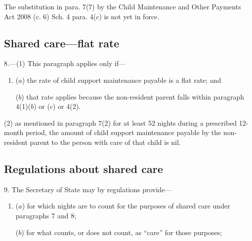 \documentclass[12pt,a4paper]{article}
\begin{document}
{{The substitution in para. 7(7) by the Child Maintenance and Other Payments Act 2008 (c. 6) Sch. 4 para. 4($c$) is not yet in force.
}

\subsection*{Shared care---flat rate}

8.—(1) This paragraph applies only if---
\begin{enumerate}\item[]
($a$) the rate of child support maintenance payable is a flat rate; and

($b$) that rate applies because the non-resident parent falls within paragraph
4(1)($b$) or ($c$) or 4(2).
\end{enumerate}

(2) 
 as mentioned in paragraph 7(2) for at least 52 nights during a prescribed 12-month period, the amount of child support maintenance payable by the non-resident parent to the person with care of that child is nil.


\subsection*{Regulations about shared care}

9. The Secretary of State may by regulations provide---
\begin{enumerate}\item[]

($a$) for which nights are to count for the purposes of shared care under
paragraphs 7 and 8;

($b$) for what counts, or does not count, as “care” for those purposes; 



\end{enumerate}}
\end{document}
